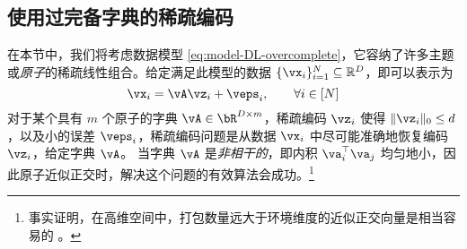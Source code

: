 \documentclass[../../book-main_zh.tex]{subfiles}
\begin{document}
%

\subsection{使用过完备字典的稀疏编码} 

在本节中，我们将考虑数据模型 \eqref{eq:model-DL-overcomplete}，它容纳了许多主题或\textit{原子}的稀疏线性组合。给定满足此模型的数据 \(\{\vx_{i}\}_{i = 1}^{N} \subseteq \R^{D}\)，即可以表示为
\begin{equation}\label{eq:vectorized_sparse_dl_dgp}
    \vx_{i} = \vA\vz_{i} + \veps_{i}, \qquad \forall i \in [N]
\end{equation}
对于某个具有 $m$ 个原子的字典 $\vA \in \bR^{D \times m}$，稀疏编码 $\vz_i$ 使得 $\norm{\vz_i}_0 \leq d$，以及小的误差 $\veps_i$，稀疏编码问题是从数据 $\vx_i$ 中尽可能准确地恢复编码 $\vz_i$，给定字典 $\vA$。
当字典 \(\vA\) 是\textit{非相干的}，即内积 \(\va_{i}^{\top}\va_{j}\) 均匀地小，因此原子近似正交时，解决这个问题的有效算法会成功。\footnote{事实证明，在高维空间中，打包数量远大于环境维度的近似正交向量是相当容易的 \cite{Wright-Ma-2022}。}

\end{document}
